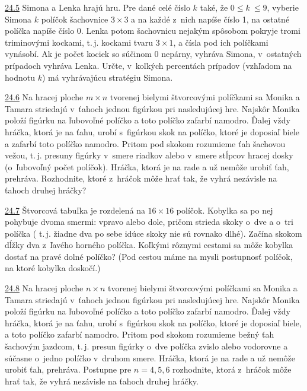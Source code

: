 \noindent \ul{24.5}  Simona a Lenka hrajú hru. Pre dané celé číslo $k$ také, že $0 \leq k~\leq 9$, vyberie Simona $k$ políčok šachovnice $3 \times 3$ a na každé z~nich napíše číslo 1, na ostatné políčka napíše číslo 0. Lenka potom šachovnicu nejakým spôsobom pokryje tromi triminovými kockami,  t.\,j. kockami tvaru $3\times1$, a čísla pod ich políčkami vynásobí. Ak je počet kociek so súčinom 0 nepárny, vyhráva Simona, v~ostatných prípadoch vyhráva Lenka. Určte, v~koľkých percentách prípadov (vzhľadom na hodnotu $k$) má vyhrávajúcu stratégiu Simona.




\noindent \ul{24.6}  Na hracej ploche $m\times n$ tvorenej bielymi štvorcovými políčkami sa Monika a Tamara striedajú v~ťahoch jednou figúrkou pri nasledujúcej hre. Najskôr Monika položí figúrku na ľubovoľné políčko a toto políčko zafarbí namodro. Ďalej vždy hráčka, ktorá je na ťahu, urobí s~figúrkou skok na políčko, ktoré je doposiaľ biele a zafarbí toto políčko namodro. Pritom pod skokom rozumieme ťah šachovou vežou,  t.\,j. presuny figúrky v~smere riadkov alebo v~smere stĺpcov hracej dosky (o~ľubovoľný počet políčok). Hráčka, ktorá je na rade a už nemôže urobiť ťah, prehráva. Rozhodnite, ktoré z~hráčok môže hrať tak, že vyhrá nezávisle na ťahoch druhej hráčky?




\noindent \ul{24.7} 
Štvorcová tabuľka je rozdelená na $16\times16$ políčok. Kobylka sa po nej pohybuje dvoma smermi: vpravo alebo dole, pričom strieda skoky o~dve a o~tri políčka ( t.\,j. žiadne dva po sebe idúce skoky nie sú rovnako dlhé). Začína skokom dĺžky dva z~ľavého horného políčka. Koľkými rôznymi cestami sa môže kobylka dostať na pravé dolné políčko? (Pod cestou máme na mysli postupnosť políčok, na ktoré kobylka doskočí.)




\noindent \ul{24.8} 
Na hracej ploche $n \times n$ tvorenej bielymi štvorcovými políčkami sa Monika a Tamara striedajú v~ťahoch jednou figúrkou pri nasledujúcej hre. Najskôr Monika položí figúrku na ľubovoľné políčko a toto políčko zafarbí namodro. Ďalej vždy hráčka, ktorá je na ťahu, urobí s~figúrkou skok na políčko, ktoré je doposiaľ biele, a toto políčko zafarbí namodro. Pritom pod skokom rozumieme bežný ťah šachovým jazdcom,  t.\,j. presun figúrky o~dve políčka zvislo alebo vodorovne a súčasne o~jedno políčko v~druhom smere. Hráčka, ktorá je na rade a už nemôže urobiť ťah, prehráva. Postupne pre $n = 4, 5, 6$ rozhodnite, ktorá z~hráčok môže hrať tak, že vyhrá nezávisle na ťahoch druhej hráčky.




